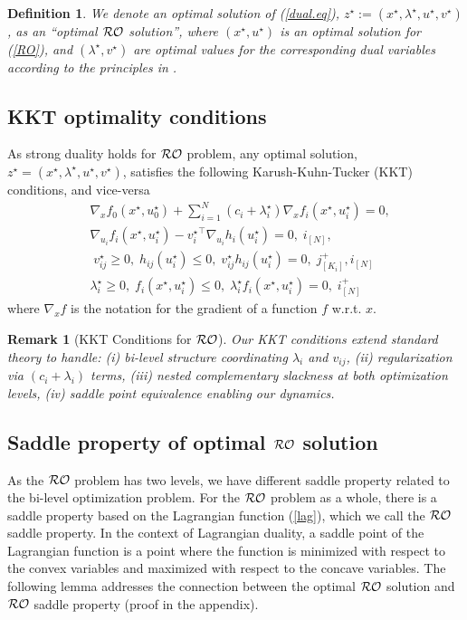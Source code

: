 \documentclass[journal,twoside,web]{ieeecolor}
\newcommand{\rev}[1]{\textcolor{revisionblue}{#1}}
\newtheorem{definition}{Definition}
\newtheorem{remark}{Remark}
\begin{document}
\begin{definition} \label{optimal_ro}
We denote an optimal solution of (\ref{dual.eq}), $z^\star:=(x^\star,\lambda^\star,u^\star,v^\star)$, as an ``optimal ${\cal RO}$ solution'', where $(x^\star, u^\star)$ is an optimal solution for (\ref{RO}), and $(\lambda^\star, v^\star)$ are optimal values for the corresponding dual variables according to the principles in \cite[Section~5.9.1]{boyd2004}.
\end{definition}

\subsection{KKT optimality conditions}

As strong duality holds for ${\cal RO}$ problem, any optimal solution, $z^\star=(x^\star,\lambda^\star,u^\star,v^\star)$, satisfies the following Karush-Kuhn-Tucker (KKT) conditions, and vice-versa \cite{boyd2004}
\begin{align}
&\nabla_x f_0(x^\star,u_0^\star)+  \sum_{i=1}^N(c_i+\lambda^\star_i) \nabla_x f_i(x^\star,u_i^\star)=0,\label{kkt1}\\
&\nabla_{u_i} f_i(x^\star,u_i^\star)-{v_i^\star}^\top \nabla_{u_i} h_i(u_i^\star)=0,\; i_ {[N]},\label{kkt2}\\
&\;v_{ij}^\star\geq 0,\; h_{ij}(u_i^\star)\leq 0,\;v_{ij}^\star h_{ij}(u_i^\star)=0,\;  j^+_{[K_i]}, i_{[N]} \label{kkt3}\\
&\lambda_i^\star\geq 0,\;f_{i}(x^\star,u_i^\star)\leq 0,\;\lambda_i^\star f_{i}(x^\star,u_i^\star)=0,\;i^+_{[N]} \label{kkt4}
\end{align}
where $\nabla_x f$ is the notation for the gradient of a function $f$ w.r.t. $x$.

\begin{remark}[\rev{KKT Conditions for ${\cal RO}$}]
\rev{Our KKT conditions extend standard theory \cite{boyd2004} to handle: (i) bi-level structure coordinating $\lambda_i$ and $v_{ij}$, (ii) regularization via $(c_i + \lambda_i)$ terms, (iii) nested complementary slackness at both optimization levels, (iv) saddle point equivalence enabling our dynamics.}
\end{remark}

\subsection{Saddle property of optimal ${\cal RO}$ solution}

As the ${\cal RO}$ problem has two levels, we have different saddle property related to the bi-level optimization problem. For the ${\cal RO}$ problem as a whole, there is a saddle property based on the Lagrangian function (\ref{lag}), which we call the ${\cal RO}$ saddle property. In the context of Lagrangian duality, a saddle point of the Lagrangian function is a point where the function is minimized with respect to the convex variables and maximized with respect to the concave variables. The following lemma addresses the connection between the optimal ${\cal RO}$ solution and ${\cal RO}$ saddle property (proof in the appendix).
\end{document}
